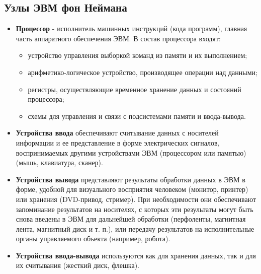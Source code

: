 \subsection{Узлы ЭВМ фон Неймана}
\begin{itemize}
  \item \textbf{Процессор} - исполнитель машинных инструкций (кода программ), главная часть аппаратного обеспечения ЭВМ. В состав процессора входят:
      \begin{itemize}
        \item устройство управления выборкой команд из памяти и их выполнением;
        \item арифметико-логическое устройство, производящее операции над данными;
        \item регистры, осуществляющие временное хранение данных и состояний процессора;
        \item схемы для управления и связи с подсистемами памяти и ввода-вывода.
      \end{itemize}
  \item \textbf{Устройства ввода} обеспечивают считывание данных с носителей информации и ее представление в форме электрических сигналов, воспринимаемых другими устройствами ЭВМ (процессором или памятью) (мышь, клавиатура, сканер).
  \item \textbf{Устройства вывода} представляют результаты обработки данных в ЭВМ в форме, удобной для визуального восприятия человеком (монитор, принтер) или хранения (DVD-привод, стример). При необходимости они обеспечивают запоминание результатов на носителях, с которых эти результаты могут быть снова введены в ЭВМ для дальнейшей обработки (перфоленты, магнитная лента, магнитный диск и т. п.), или передачу результатов на исполнительные органы управляемого объекта (например, робота). 
  \item \textbf{Устройства ввода-вывода} используются как для хранения данных, так и для их считывания (жесткий диск, флешка).
\end{itemize}
